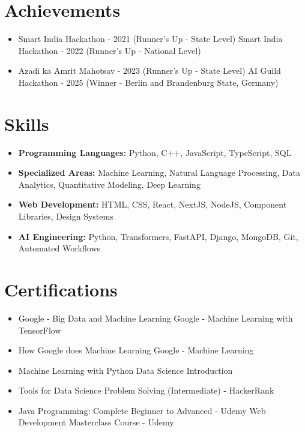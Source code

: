 \documentclass[a4paper,10pt]{article}
\begin{document}
\section*{Achievements}
\begin{itemize}
\item Smart India Hackathon - 2021 (Runner's Up - State Level) \hfill Smart India Hackathon - 2022 (Runner's Up - National Level)
\item Azadi ka Amrit Mahotsav - 2023 (Runner's Up - State Level) \hfill AI Guild Hackathon - 2025 (Winner - Berlin and Brandenburg State, Germany)
\end{itemize}

\section*{Skills}
\begin{itemize}
  \item \textbf{Programming Languages:} Python, C++, JavaScript, TypeScript, SQL
  \item \textbf{Specialized Areas:} Machine Learning, Natural Language Processing, Data Analytics, Quantitative Modeling, Deep Learning
  \item \textbf{Web Development:} HTML, CSS, React, NextJS, NodeJS, Component Libraries, Design Systems
  \item \textbf{AI Engineering:} Python, Transformers, FastAPI, Django, MongoDB, Git, Automated Workflows
\end{itemize}

\section*{Certifications}
\begin{itemize}
\item Google - Big Data and Machine Learning \hfill Google - Machine Learning with TensorFlow
\item How Google does Machine Learning \hfill Google - Machine Learning
\item Machine Learning with Python \hfill Data Science Introduction
\item Tools for Data Science \hfill Problem Solving (Intermediate) - HackerRank
\item Java Programming: Complete Beginner to Advanced - Udemy \hfill Web Development Masterclass Course - Udemy
\end{itemize}
\end{document}

